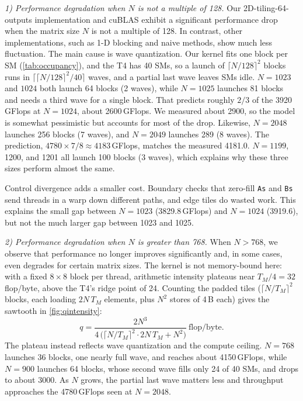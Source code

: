 \documentclass[letterpaper,twocolumn,10pt]{article}
\begin{document}
\smallskip
\noindent\emph{1) Performance degradation when $N$ is not a multiple of 128.}
Our 2D-tiling-64-outputs implementation and cuBLAS exhibit a significant performance
drop when the matrix size $N$ is not a multiple of 128. In contrast, other
implementations, such as 1-D blocking and naive methods, show much less fluctuation.
The main cause is wave quantization. Our kernel fits one block per SM
(\cref{tab:occupancy}), and the T4 has 40 SMs, so a launch of
$\lceil N/128\rceil^2$ blocks runs in $\lceil \lceil N/128\rceil^2/40\rceil$ waves,
and a partial last wave leaves SMs idle. $N=1023$ and $1024$ both launch 64 blocks
(2 waves), while $N=1025$ launches 81 blocks and needs a third wave for a single
block. That predicts roughly $2/3$ of the 3920\,GFlops at $N=1024$, about 2600\,GFlops.
We measured about 2900, so the model is somewhat pessimistic but accounts for most
of the drop. Likewise,
$N=2048$ launches 256 blocks (7 waves), and $N=2049$ launches 289 (8 waves). The
prediction, $4780\times7/8 \approx 4183$\,GFlops, matches the measured 4181.0.
$N=1199$, 1200, and 1201 all launch 100 blocks (3 waves), which explains why these
three sizes perform almost the same.

Control divergence adds a smaller cost. Boundary checks that zero-fill
\texttt{As} and \texttt{Bs} send threads in a warp down different paths, and edge
tiles do wasted work. This explains the small gap between $N=1023$ (3829.8\,GFlops)
and $N=1024$ (3919.6), but not the much larger gap between 1023 and 1025.

\smallskip
\noindent\emph{2) Performance degradation when $N$ is greater than 768.}
When $N>768$, we observe that performance no longer improves significantly and, in
some cases, even degrades for certain matrix sizes. The kernel is not memory-bound
here: with a fixed $8\times8$ block per thread, arithmetic intensity plateaus near
$T_M/4 = 32$\,flop/byte, above the T4's ridge point of 24. Counting the padded tiles
($\lceil N/T_M\rceil^2$ blocks, each loading $2N\,T_M$ elements, plus $N^2$ stores of
4\,B each) gives the sawtooth in \cref{fig:qintensity}:
\begin{equation*}
q = \frac{2N^3}{4\,\bigl(\bigl\lceil N/T_M \bigr\rceil^2 \cdot 2N\,T_M + N^2\bigr)}\
\text{flop/byte}.
\end{equation*}
The plateau instead reflects wave quantization and the compute ceiling. $N=768$
launches 36 blocks, one nearly full wave, and reaches about 4150\,GFlops, while
$N=900$ launches 64 blocks, whose second wave fills only 24 of 40 SMs, and drops to
about 3000. As $N$ grows, the partial last wave matters less and throughput
approaches the 4780\,GFlops seen at $N=2048$.
\end{document}
